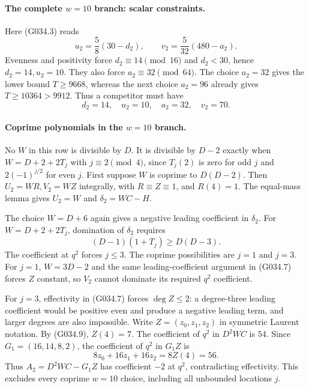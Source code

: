 \paragraph{The complete $w=10$ branch: scalar constraints.}
Here (G034.3) reads
\[
 u_2=\frac58(30-d_2),\qquad
 v_2=\frac5{32}(480-a_2).
\]
Evenness and positivity force $d_2\equiv14\pmod{16}$
and $d_2<30$, hence $d_2=14,u_2=10$.
They also force $a_2\equiv32\pmod{64}$.
The choice $a_2=32$ gives the lower bound $T\ge9668$,
whereas the next choice $a_2=96$ already gives
$T\ge10364>9912$. Thus a competitor must have
\[
                  d_2=14,\quad u_2=10,\quad
                  a_2=32,\quad v_2=70.               \tag{G034.9}
\]

\paragraph{Coprime polynomials in the $w=10$ branch.}
No $W$ in this row is divisible by $D$.
It is divisible by $D-2$ exactly when
$W=D+2+2T_j$ with $j\equiv2\pmod4$, since
$T_j(2)$ is zero for odd $j$ and
$2(-1)^{j/2}$ for even $j$.
First suppose $W$ is coprime to $D(D-2)$.
Then $U_2=WR,V_2=WZ$ integrally, with
$R\equiv Z\equiv1$, and $R(4)=1$.
The equal-mass lemma gives $U_2=W$ and
$\delta_2=WC-H$.

The choice $W=D+6$ again gives a negative leading
coefficient in $\delta_2$. For
$W=D+2+2T_j$, domination of $\delta_2$ requires
\[
                       (D-1)(1+T_j)\ge D(D-3).
\]
The coefficient at $q^2$ forces $j\le3$.
The coprime possibilities are $j=1$ and $j=3$.
For $j=1$, $W=3D-2$ and the same leading-coefficient
argument in (G034.7) forces $Z$ constant, so $V_2$
cannot dominate its required $q^2$ coefficient.

For $j=3$, effectivity in (G034.7) forces
$\deg Z\le2$: a degree-three leading coefficient
would be positive even and produce a negative leading
term, and larger degrees are also impossible.
Write $Z=(z_0,z_1,z_2)$ in symmetric Laurent notation.
By (G034.9), $Z(4)=7$.
The coefficient of $q^2$ in $D^2WC$ is $54$.
Since $G_1=(16,14,8,2)$, the coefficient of $q^2$
in $G_1Z$ is
\[
        8z_0+16z_1+16z_2=8Z(4)=56.
\]
Thus $A_2=D^2WC-G_1Z$ has coefficient $-2$ at $q^2$,
contradicting effectivity. This excludes every coprime
$w=10$ choice, including all unbounded locations $j$.

